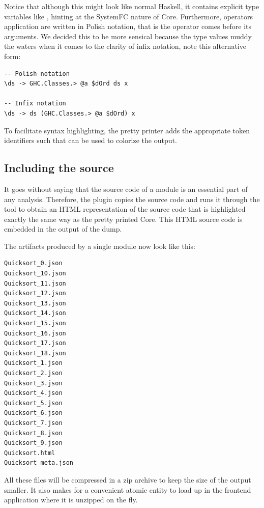 Notice that although this might look like normal Haskell, it contains explicit type variables like
, hinting at the SystemFC nature of Core. Furthermore, operators application are written in 
Polish notation, that is the operator comes before its arguments. We decided this to be more sensical because the type
values muddy the waters when it comes to the clarity of infix notation, note this alternative form:

\begin{listing}[H]
\begin{verbatim}
-- Polish notation
\ds -> GHC.Classes.> @a $dOrd ds x

-- Infix notation
\ds -> ds (GHC.Classes.> @a $dOrd) x
\end{verbatim}
\end{listing}

To facilitate syntax highlighting, the pretty printer adds the appropriate token identifiers such that 
 \cite{pygments} can be used to colorize the output.


\subsection{Including the source}
It goes without saying that the source code of a module is an essential part of any analysis. Therefore,
the plugin copies the source code and runs it through the  \cite{pygments} tool to obtain
an HTML representation of the source code that is highlighted exactly the same way as the pretty printed Core.
This HTML source code is embedded in the output of the dump.

The artifacts produced by a single module now look like this:

\begin{listing}[H]
\begin{verbatim}
Quicksort_0.json
Quicksort_10.json
Quicksort_11.json
Quicksort_12.json
Quicksort_13.json
Quicksort_14.json
Quicksort_15.json
Quicksort_16.json
Quicksort_17.json
Quicksort_18.json
Quicksort_1.json
Quicksort_2.json
Quicksort_3.json
Quicksort_4.json
Quicksort_5.json
Quicksort_6.json
Quicksort_7.json
Quicksort_8.json
Quicksort_9.json
Quicksort.html
Quicksort_meta.json
\end{verbatim}
\end{listing}

All these files will be compressed in a zip archive to keep the size of the output smaller. It also makes for
a convenient atomic entity to load up in the frontend application where it is unzipped on the fly.


